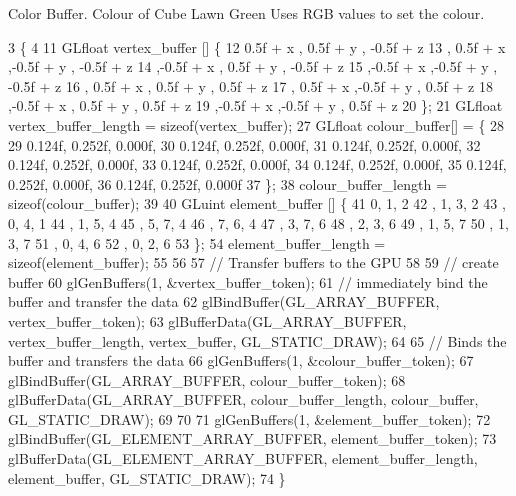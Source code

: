 Color Buffer. Colour of Cube Lawn Green Uses R\+G\+B values to set the colour.
\begin{DoxyCode}
3                                                          \{
4   
11   GLfloat vertex\_buffer [] \{
12       0.5f + x  , 0.5f + y  , -0.5f + z
13     , 0.5f + x  ,-0.5f + y  , -0.5f + z
14     ,-0.5f + x  , 0.5f + y  , -0.5f + z
15     ,-0.5f + x  ,-0.5f + y  , -0.5f + z
16     , 0.5f + x  , 0.5f + y  ,  0.5f + z
17     , 0.5f + x  ,-0.5f + y  ,  0.5f + z
18     ,-0.5f + x  , 0.5f + y  ,  0.5f + z
19     ,-0.5f + x  ,-0.5f + y  ,  0.5f + z
20   \};
21   GLfloat vertex\_buffer\_length = \textcolor{keyword}{sizeof}(vertex\_buffer);
27   GLfloat colour\_buffer[] = \{
28 
29      0.124f, 0.252f, 0.000f,
30      0.124f, 0.252f, 0.000f,
31      0.124f, 0.252f, 0.000f,
32      0.124f, 0.252f, 0.000f,
33      0.124f, 0.252f, 0.000f,
34      0.124f, 0.252f, 0.000f,
35      0.124f, 0.252f, 0.000f,
36      0.124f, 0.252f, 0.000f
37   \};
38   colour\_buffer\_length = \textcolor{keyword}{sizeof}(colour\_buffer);
39   
40   GLuint element\_buffer []  \{
41       0, 1, 2   
42     , 1, 3, 2
43     , 0, 4, 1   
44     , 1, 5, 4   
45     , 5, 7, 4   
46     , 7, 6, 4   
47     , 3, 7, 6   
48     , 2, 3, 6   
49     , 1, 5, 7   
50     , 1, 3, 7   
51     , 0, 4, 6   
52     , 0, 2, 6   
53   \};
54   element\_buffer\_length = \textcolor{keyword}{sizeof}(element\_buffer);
55 
56 
57   \textcolor{comment}{// Transfer buffers to the GPU}
58 
59   \textcolor{comment}{// create buffer}
60   glGenBuffers(1, &vertex\_buffer\_token);
61   \textcolor{comment}{// immediately bind the buffer and transfer the data}
62   glBindBuffer(GL\_ARRAY\_BUFFER, vertex\_buffer\_token);
63   glBufferData(GL\_ARRAY\_BUFFER, vertex\_buffer\_length, vertex\_buffer, GL\_STATIC\_DRAW);
64 
65   \textcolor{comment}{// Binds the buffer and transfers the data}
66   glGenBuffers(1, &colour\_buffer\_token);
67   glBindBuffer(GL\_ARRAY\_BUFFER, colour\_buffer\_token);
68   glBufferData(GL\_ARRAY\_BUFFER, colour\_buffer\_length, colour\_buffer, GL\_STATIC\_DRAW);
69 
70 
71   glGenBuffers(1, &element\_buffer\_token);
72   glBindBuffer(GL\_ELEMENT\_ARRAY\_BUFFER, element\_buffer\_token);
73   glBufferData(GL\_ELEMENT\_ARRAY\_BUFFER, element\_buffer\_length, element\_buffer, GL\_STATIC\_DRAW);
74 \}
\end{DoxyCode}
\hypertarget{classGroundAsset_a8f607f3cabded6280c5a5eb2cbfa8c79}{}
